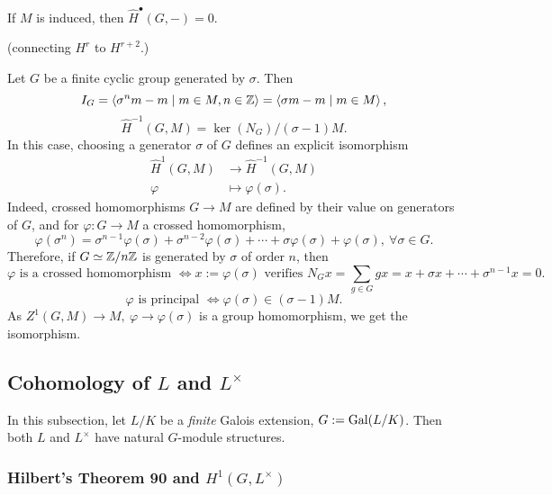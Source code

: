 \begin{proposition}
    If $M$ is induced, then $\hat H^\bullet(G, -) = 0$.
\end{proposition}

(connecting $H^r$ to $H^{r + 2}$.)

\begin{example}\label{eg: H1 to H-1 for finite cyclic group}
    Let $G$ be a finite cyclic group generated by $\sigma$.
    Then \[I_G = \left\langle \sigma^n m - m\mid m\in M, n\in\mathbb{Z}  \right\rangle = \left\langle \sigma m - m\mid m\in M \right\rangle,\]
    \[\hat H^{-1}(G, M) = \ker(N_G)/(\sigma - 1)M.\]
    In this case, choosing a generator $\sigma$ of $G$ defines an explicit isomorphism
    \begin{align*}
        \hat H^1(G, M) &\to \hat H^{-1}(G, M)\\
        \varphi&\mapsto \varphi(\sigma).
    \end{align*}
    Indeed, crossed homomorphisms $G\to M$ are defined by their value on generators of $G$, and for $\varphi : G\to M$ a crossed homomorphism, \[
    \varphi(\sigma^n) = \sigma^{n-1}\varphi(\sigma) + \sigma^{n-2}\varphi(\sigma) + \cdots + \sigma\varphi(\sigma) + \varphi(\sigma),\ \forall \sigma\in G.\]
    Therefore, if $G\simeq \mathbb{Z}/n\mathbb{Z}$ is generated by $\sigma$ of order $n$,
    then \[\varphi\text{ is a crossed homomorphism }\iff x := \varphi(\sigma) \text{ verifies } N_Gx = \sum_{g\in G} gx = x + \sigma x + \cdots + \sigma^{n-1}x =0.\]
    \[\varphi \text{ is principal }\iff \varphi(\sigma) \in \left( \sigma - 1 \right)M.\]
    As $Z^1(G, M)\to M,\ \varphi\to \varphi(\sigma)$ is a group homomorphism, we get the isomorphism.
\end{example}


\subsection{Cohomology of \texorpdfstring{$L$ and $L^\times$}{PDFstring}}
In this subsection, let $L/K$ be a \textit{finite} Galois extension, $G := \operatorname{Gal}(L/K)$. Then both $L$ and $L^\times$ have natural $G$-module structures.

\subsubsection{Hilbert's Theorem 90 and \texorpdfstring{$H^1(G, L^\times)$}{H1(G, L cross)}}


